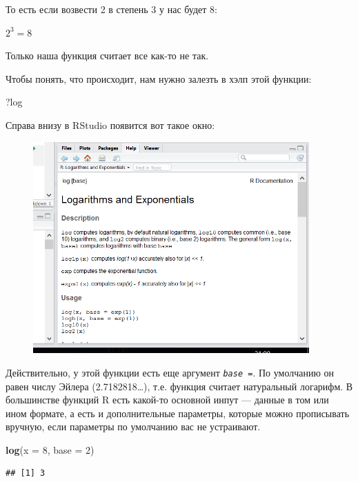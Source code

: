 \documentclass[]{book}
\newenvironment{Shaded}{\begin{snugshade}}{\end{snugshade}}
\newcommand{\KeywordTok}[1]{\textcolor[rgb]{0.13,0.29,0.53}{\textbf{#1}}}
\newcommand{\DataTypeTok}[1]{\textcolor[rgb]{0.13,0.29,0.53}{#1}}
\newcommand{\DecValTok}[1]{\textcolor[rgb]{0.00,0.00,0.81}{#1}}
\newcommand{\NormalTok}[1]{#1}
\begin{document}
То есть если возвести 2 в степень 3 у нас будет 8:

\(2^3 = 8\)

Только наша функция считает все как-то не так.

Чтобы понять, что происходит, нам нужно залезть в хэлп этой функции:

\begin{Shaded}
\begin{Highlighting}[]
\NormalTok{?log}
\end{Highlighting}
\end{Shaded}

Справа внизу в RStudio появится вот такое окно:

\begin{figure}
\centering
\includegraphics[width=4.16667in]{images/help.png}
\caption{}
\end{figure}

Действительно, у этой функции есть еще аргумент \emph{\texttt{base\ =}}.
По умолчанию он равен числу Эйлера (2.7182818\ldots{}), т.е. функция
считает натуральный логарифм. В большинстве функций R есть какой-то
основной инпут --- данные в том или ином формате, а есть и
дополнительные параметры, которые можно прописывать вручную, если
параметры по умолчанию вас не устраивают.

\begin{Shaded}
\begin{Highlighting}[]
\KeywordTok{log}\NormalTok{(}\DataTypeTok{x =} \DecValTok{8}\NormalTok{, }\DataTypeTok{base =} \DecValTok{2}\NormalTok{)}
\end{Highlighting}
\end{Shaded}

\begin{verbatim}
## [1] 3
\end{verbatim}
\end{document}
